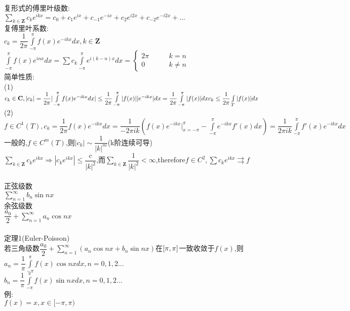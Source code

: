 \documentclass[11pt, a4paper, UTF8]{ctexart}
\begin{document}
复形式的傅里叶级数:\\
$ \sum\limits_{k\in\mathbf{Z}}c_ke^{ikx}=c_0+c_1e^{ix}+c_{-1}e^{-ix}+c_{2}e^{i2x}+c_{-2}e^{-i2x}+... $\\
复傅里叶系数:\\
$ c_k=\dfrac{1}{2\pi}\int\limits_{-\pi}^{\pi}f(x)e^{-ikx}dx,k\in\mathbf{Z} $\\
$ \int\limits_{-\pi}^{\pi}f(x)e^{inx}dx=\sum c_k\int\limits_{-\pi}^{\pi}e^{i(k-n)x}dx=
\left\{
\begin{aligned}
2\pi\qquad&k=n\\
0\qquad&k\not=n
\end{aligned}
\right. $\\
简单性质:\\
(1)$ c_k\in\mathbf{C},|c_k|=\dfrac{1}{2\pi}|\int\limits_{-\pi}^{\pi}f(x)e^{-ikx}dx|\le\dfrac{1}{2\pi}\int\limits_{-\pi}^{\pi}|f(x)||e^{-ikx}|dx=\dfrac{1}{2\pi}\int\limits_{-\pi}^{\pi}|f(x)|dx\\
c_k\le\dfrac{1}{2\pi}\int\limits_T|f(x)|dx $\\
(2)$ f\in C^1(T),c_k=\dfrac{1}{2\pi}f(x)e^{-ikx}dx=\dfrac{1}{-2\pi ik}(f(x)e^{-ikx}|_{x=-\pi}^{\pi}-\int\limits_{-\pi}^{\pi}e^{-ikx}f'(x)dx)=\dfrac{1}{2\pi ik}\int\limits_{-\pi}^{\pi}f'(x)e^{-ikx}dx $\\
一般的,$ f\in C^m(T) $,则$ |c_k|\sim\dfrac{1}{|k|^m} $(k阶连续可导)\\
$ \sum\limits_{k\in\mathbf{Z}}c_ke^{ikx}\Rightarrow|c_ke^{ikx}|\le\dfrac{c}{|k|^2} $,而$ \sum\limits_{k\in\mathbf{Z}}\dfrac{1}{|k|^2}<\infty $,therefore$ f\in C^2,\sum c_ke^{ikx}\rightrightarrows f $\\
\\
正弦级数\\
$ \sum\limits_{n=1}^{\infty}b_n\sin nx $\\
余弦级数\\
$ \dfrac{a_0}{2}+\sum\limits_{n=1}^{\infty}a_n\cos nx $\\
\\
定理1(Euler-Poisson)\\
若三角级数$ \dfrac{a_0}{2}+\sum\limits^{\infty}_{n=1}(a_n\cos nx+b_n\sin nx) $在$ [\-\pi,\pi] $一致收敛于$ f(x) $,则\\
$ a_n=\dfrac{1}{\pi}\int\limits_{-\pi}^{\pi}f(x)\cos nxdx,n=0,1,2... $\\
$ b_n=\dfrac{1}{\pi}\int\limits_{-\pi}^{\pi}f(x)\sin nxdx,n=0,1,2... $\\
例:\\
$ f(x)=x,x\in[-\pi,\pi) $\\
\end{document}

